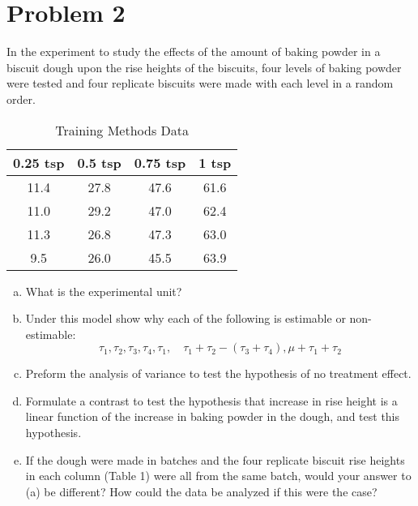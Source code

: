\documentclass{article}
\begin{document}
\section{Problem 2}
In the experiment to study the effects of the amount of baking powder in a biscuit dough upon the rise heights of the biscuits, four
levels of baking powder were tested and four replicate biscuits  were made with each level in a random order.
\begin{table}[!ht]
	\centering
	\caption{Training Methods Data}
	\begin{tabular}{c c c c}
		\hline
		\textbf{0.25 tsp} & \textbf{0.5 tsp} & \textbf{0.75 tsp} & \textbf{1 tsp} \\
		\hline
		11.4              & 27.8             & 47.6              & 61.6           \\
		11.0              & 29.2             & 47.0              & 62.4           \\
		11.3              & 26.8             & 47.3              & 63.0           \\
		9.5               & 26.0             & 45.5              & 63.9           \\
		\hline
	\end{tabular}
\end{table}
\begin{enumerate}[(a)]
	\item What is the experimental unit?
	\item Under this model  show why each of the following is estimable or non-estimable:
	      $$
		      \tau_1, \tau_2, \tau_3,\tau_4,\tau_1, \quad \tau_1 + \tau_2 - (\tau_3 + \tau_4), \mu + \tau_1 + \tau_2
	      $$
	\item Preform the analysis of variance to test the hypothesis of no treatment effect.
	\item Formulate a contrast to test the hypothesis that increase in rise height is a linear function of the increase in baking powder in the dough,
	      and test this hypothesis.
	\item If the dough were made in batches and the four replicate biscuit rise heights in each column (Table 1) were all from the same batch, would your answer to (a) be different?
	      How could the data be analyzed if this were the case?
\end{enumerate}
\end{document}
